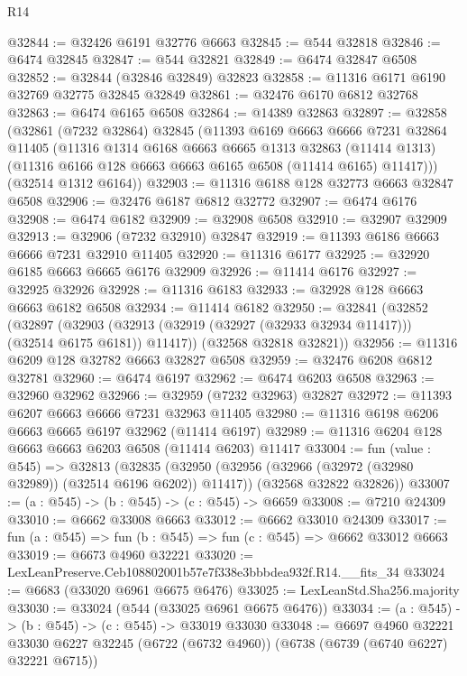 \begin{lexlean}{R14}
\begin{coremodule}
@32844 := @32426 @6191 @32776 @6663
@32845 := @544 @32818
@32846 := @6474 @32845
@32847 := @544 @32821
@32849 := @6474 @32847 @6508
@32852 := @32844 (@32846 @32849) @32823
@32858 := @11316 @6171 @6190 @32769 @32775 @32845 @32849
@32861 := @32476 @6170 @6812 @32768
@32863 := @6474 @6165 @6508
@32864 := @14389 @32863
@32897 := @32858
    (@32861
      (@7232 @32864)
      @32845
      (@11393
        @6169
        @6663
        @6666
        @7231
        @32864
        @11405
        (@11316
          @1314
          @6168
          @6663
          @6665
          @1313
          @32863
          (@11414 @1313)
          (@11316 @6166 @128 @6663 @6663 @6165 @6508 (@11414 @6165) @11417)))
      (@32514 @1312 @6164))
@32903 := @11316 @6188 @128 @32773 @6663 @32847 @6508
@32906 := @32476 @6187 @6812 @32772
@32907 := @6474 @6176
@32908 := @6474 @6182
@32909 := @32908 @6508
@32910 := @32907 @32909
@32913 := @32906 (@7232 @32910) @32847
@32919 := @11393 @6186 @6663 @6666 @7231 @32910 @11405
@32920 := @11316 @6177
@32925 := @32920 @6185 @6663 @6665 @6176 @32909
@32926 := @11414 @6176
@32927 := @32925 @32926
@32928 := @11316 @6183
@32933 := @32928 @128 @6663 @6663 @6182 @6508
@32934 := @11414 @6182
@32950 := @32841
    (@32852
      (@32897
        (@32903 (@32913 (@32919 (@32927 (@32933 @32934 @11417))) (@32514 @6175 @6181)) @11417))
      (@32568 @32818 @32821))
@32956 := @11316 @6209 @128 @32782 @6663 @32827 @6508
@32959 := @32476 @6208 @6812 @32781
@32960 := @6474 @6197
@32962 := @6474 @6203 @6508
@32963 := @32960 @32962
@32966 := @32959 (@7232 @32963) @32827
@32972 := @11393 @6207 @6663 @6666 @7231 @32963 @11405
@32980 := @11316 @6198 @6206 @6663 @6665 @6197 @32962 (@11414 @6197)
@32989 := @11316 @6204 @128 @6663 @6663 @6203 @6508 (@11414 @6203) @11417
@33004 := fun (value : @545) =>
  @32813
    (@32835
      (@32950 (@32956 (@32966 (@32972 (@32980 @32989)) (@32514 @6196 @6202)) @11417))
      (@32568 @32822 @32826))
@33007 := (a : @545) -> (b : @545) -> (c : @545) -> @6659
@33008 := @7210 @24309
@33010 := @6662 @33008 @6663
@33012 := @6662 @33010 @24309
@33017 := fun (a : @545) => fun (b : @545) => fun (c : @545) => @6662 @33012 @6663
@33019 := @6673 @4960 @32221
@33020 := LexLeanPreserve.Ceb108802001b57e7f338e3bbbdea932f.R14.__fits_34
@33024 := @6683 (@33020 @6961 @6675 @6476)
@33025 := LexLeanStd.Sha256.majority
@33030 := @33024 (@544 (@33025 @6961 @6675 @6476))
@33034 := (a : @545) -> (b : @545) -> (c : @545) -> @33019 @33030
@33048 := @6697
    @4960
    @32221
    @33030
    @6227
    @32245
    (@6722 (@6732 @4960))
    (@6738 (@6739 (@6740 @6227) @32221 @6715))

\end{coremodule}
\end{lexlean}
